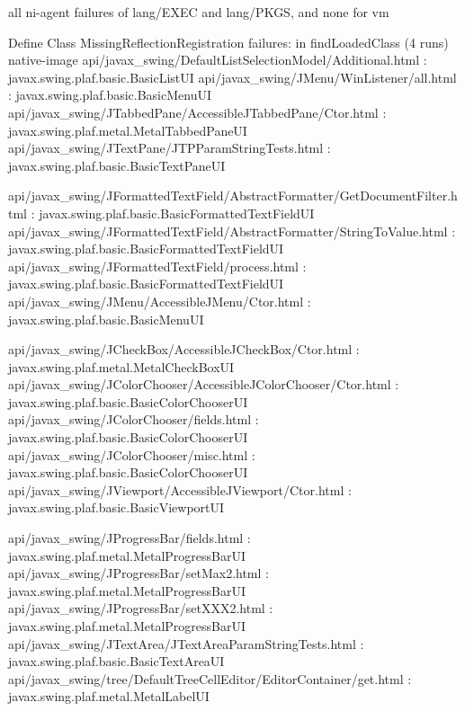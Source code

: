 all ni-agent failures of lang/EXEC and lang/PKGS, and none for vm


Define Class MissingReflectionRegistration failures: in findLoadedClass (4 runs)
native-image api/javax_swing/DefaultListSelectionModel/Additional.html : javax.swing.plaf.basic.BasicListUI
api/javax_swing/JMenu/WinListener/all.html : javax.swing.plaf.basic.BasicMenuUI
api/javax_swing/JTabbedPane/AccessibleJTabbedPane/Ctor.html : javax.swing.plaf.metal.MetalTabbedPaneUI
api/javax_swing/JTextPane/JTPParamStringTests.html : javax.swing.plaf.basic.BasicTextPaneUI

api/javax_swing/JFormattedTextField/AbstractFormatter/GetDocumentFilter.html : javax.swing.plaf.basic.BasicFormattedTextFieldUI
api/javax_swing/JFormattedTextField/AbstractFormatter/StringToValue.html : javax.swing.plaf.basic.BasicFormattedTextFieldUI
api/javax_swing/JFormattedTextField/process.html : javax.swing.plaf.basic.BasicFormattedTextFieldUI
api/javax_swing/JMenu/AccessibleJMenu/Ctor.html : javax.swing.plaf.basic.BasicMenuUI

api/javax_swing/JCheckBox/AccessibleJCheckBox/Ctor.html : javax.swing.plaf.metal.MetalCheckBoxUI
api/javax_swing/JColorChooser/AccessibleJColorChooser/Ctor.html : javax.swing.plaf.basic.BasicColorChooserUI
api/javax_swing/JColorChooser/fields.html : javax.swing.plaf.basic.BasicColorChooserUI
api/javax_swing/JColorChooser/misc.html : javax.swing.plaf.basic.BasicColorChooserUI
api/javax_swing/JViewport/AccessibleJViewport/Ctor.html : javax.swing.plaf.basic.BasicViewportUI

api/javax_swing/JProgressBar/fields.html : javax.swing.plaf.metal.MetalProgressBarUI
api/javax_swing/JProgressBar/setMax2.html : javax.swing.plaf.metal.MetalProgressBarUI
api/javax_swing/JProgressBar/setXXX2.html : javax.swing.plaf.metal.MetalProgressBarUI
api/javax_swing/JTextArea/JTextAreaParamStringTests.html : javax.swing.plaf.basic.BasicTextAreaUI
api/javax_swing/tree/DefaultTreeCellEditor/EditorContainer/get.html : javax.swing.plaf.metal.MetalLabelUI